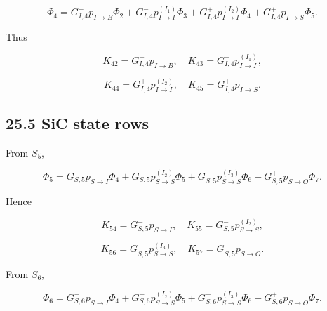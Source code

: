 \documentclass[11pt,a4paper]{article}
\begin{document}
\begin{equation}
\Phi_4=
G_{I,4}^-p_{I\rightarrow B}\Phi_2+
G_{I,4}^-p_{I\rightarrow I}^{(I_1)}\Phi_3+
G_{I,4}^+p_{I\rightarrow I}^{(I_2)}\Phi_4+
G_{I,4}^+p_{I\rightarrow S}\Phi_5.
\tag{TRISO-MR-040}
\label{eq:triso-mr-040}
\end{equation}

Thus

\begin{equation}
K_{42}=G_{I,4}^-p_{I\rightarrow B},
\quad
K_{43}=G_{I,4}^-p_{I\rightarrow I}^{(I_1)},
\tag{TRISO-MR-041}
\label{eq:triso-mr-041}
\end{equation}

\begin{equation}
K_{44}=G_{I,4}^+p_{I\rightarrow I}^{(I_2)},
\quad
K_{45}=G_{I,4}^+p_{I\rightarrow S}.
\tag{TRISO-MR-042}
\label{eq:triso-mr-042}
\end{equation}

\subsection*{25.5 SiC state rows}

From $S_5$,

\begin{equation}
\Phi_5=
G_{S,5}^-p_{S\rightarrow I}\Phi_4+
G_{S,5}^-p_{S\rightarrow S}^{(I_2)}\Phi_5+
G_{S,5}^+p_{S\rightarrow S}^{(I_3)}\Phi_6+
G_{S,5}^+p_{S\rightarrow O}\Phi_7.
\tag{TRISO-MR-043}
\label{eq:triso-mr-043}
\end{equation}

Hence

\begin{equation}
K_{54}=G_{S,5}^-p_{S\rightarrow I},
\quad
K_{55}=G_{S,5}^-p_{S\rightarrow S}^{(I_2)},
\tag{TRISO-MR-044}
\label{eq:triso-mr-044}
\end{equation}

\begin{equation}
K_{56}=G_{S,5}^+p_{S\rightarrow S}^{(I_3)},
\quad
K_{57}=G_{S,5}^+p_{S\rightarrow O}.
\tag{TRISO-MR-045}
\label{eq:triso-mr-045}
\end{equation}

From $S_6$,

\begin{equation}
\Phi_6=
G_{S,6}^-p_{S\rightarrow I}\Phi_4+
G_{S,6}^-p_{S\rightarrow S}^{(I_2)}\Phi_5+
G_{S,6}^+p_{S\rightarrow S}^{(I_3)}\Phi_6+
G_{S,6}^+p_{S\rightarrow O}\Phi_7.
\tag{TRISO-MR-046}
\label{eq:triso-mr-046}
\end{equation}
\end{document}
